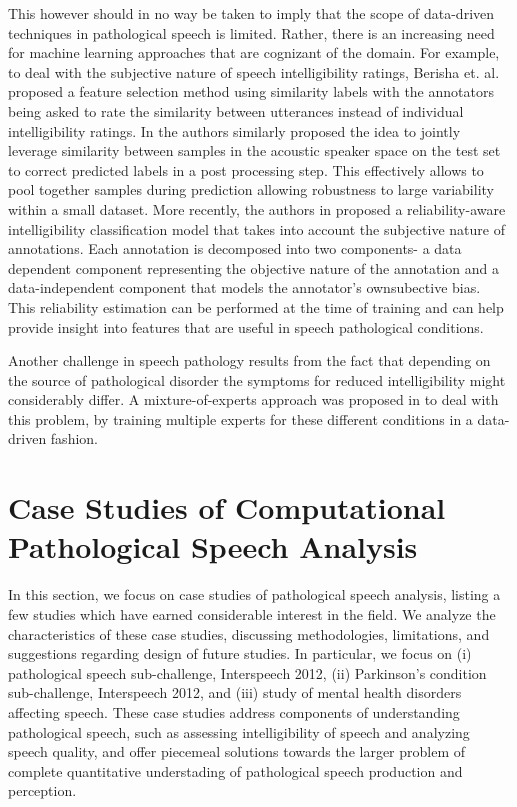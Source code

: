 \documentclass{article}
\begin{document}
This however should in no way be taken to imply that the scope of data-driven techniques in pathological speech is limited. Rather, there is an increasing need for machine learning approaches that are cognizant of the domain. For example, to deal with the subjective nature of speech intelligibility ratings, Berisha et. al. \cite{berisha2014modeling} proposed a feature selection method using similarity labels with the annotators being asked to rate the similarity between utterances instead of individual intelligibility ratings.
In \cite{kim2013pathology} the authors similarly proposed the idea to jointly leverage similarity between samples in the acoustic speaker space on the test set to correct predicted labels in a post processing step. This effectively allows to pool together samples during prediction allowing robustness to large variability within a small dataset.
More recently, the authors in \cite{kumar2015maxentrel} proposed a reliability-aware intelligibility classification model that takes into account the subjective nature of annotations. Each annotation is decomposed into two components- a data dependent component representing the objective nature of the annotation and a data-independent component that models the annotator's ownsubective bias. This reliability estimation can be performed at the time of training and can help provide insight into features that are useful in speech pathological conditions.

Another challenge in speech pathology results from the fact that depending on the source of pathological disorder the symptoms for reduced intelligibility might considerably differ. A mixture-of-experts approach was proposed in \cite{gupta2014pathology} to deal with this problem, by training multiple experts for these different conditions in a data-driven fashion.


\section{Case Studies of Computational Pathological Speech Analysis}
In this section, we focus on case studies of pathological speech analysis, listing a few studies which have earned considerable interest in the field. We analyze the characteristics of these case studies, discussing methodologies, limitations, and suggestions regarding design of future studies.
In particular, we focus on (i) pathological speech sub-challenge, Interspeech 2012, (ii) Parkinson's condition sub-challenge, Interspeech 2012, and (iii) study of mental health disorders affecting speech. 
These case studies address components of understanding pathological speech, such as assessing intelligibility of speech and analyzing speech quality, and offer piecemeal solutions towards the larger problem of complete quantitative understading of pathological speech production and perception.
\end{document}
